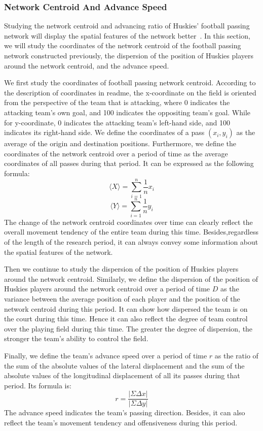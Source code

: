 \documentclass{mcmthesis}
\begin{document}
\subsubsection{Network Centroid And Advance Speed}
	Studying the network centroid and advancing ratio of Huskies' football passing network will display the spatial features of the network better~\cite{First}.  In this section, we will study the coordinates of the network centroid of the football passing network constructed previously, the dispersion of the position of Huskies players around the network centroid, and the advance speed.

	We first study the coordinates of football passing network centroid.  According to the description of coordinates in readme, the x-coordinate on the field is oriented from the perspective of the team that is attacking, where 0 indicates the attacking team's own goal, and 100 indicates the oppositing team's goal.  While for y-coordinate, 0 indicates the attacking team's left-hand side, and 100 indicates its right-hand side.  We define the coordinates of a pass $(x_{i}, y_{i})$ as the average of the origin and destination positions.  Furthermore, we define the coordinates of the network centroid over a period of time as the average coordinates of all passes during that period.  It can be expressed as the following formula: 
	$$\langle X \rangle=\sum_{i=1}^n\frac{1}{n} x_{i}$$
	$$\langle Y \rangle=\sum_{i=1}^n\frac{1}{n} y_{i}$$
	The change of the network centroid coordinates over time can clearly reflect the overall movement tendency of the entire team during this time.  Besides,regardless of the length of the research period, it can always convey some information about the spatial features of the network.

	Then we continue to study the dispersion of the position of Huskies players around the network centroid.  Similarly, we define the dispersion of the position of Huskies players around the network centroid over a period of time $D$ as the variance between the average position of each player and the position of the network centroid during this period.  It can show how dispersed the team is on the court during this time.  Hence it can also reflect the degree of team control over the playing field during this time.  The greater the degree of dispersion, the stronger the team's ability to control the field.

	Finally, we define the team's advance speed over a period of time $r$ as the ratio of the sum of the absolute values ​​of the lateral displacement and the sum of the absolute values ​​of the longitudinal displacement of all its passes during that period. Its formula is:
	$$r=\frac{|\Sigma \Delta x|}{|\Sigma \Delta y|}$$
	The advance speed indicates the team's passing direction.  Besides, it can also reflect the team's movement tendency and offensiveness during this period.
\end{document}

